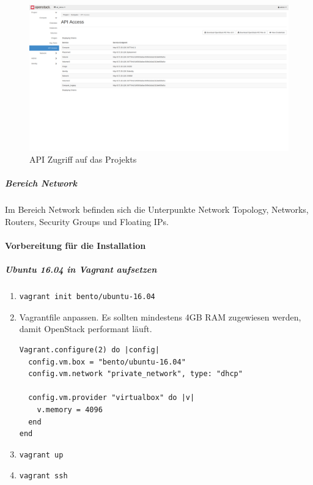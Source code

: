\documentclass[a4paper,10pt]{article}
\numberwithin{figure}{section}
\numberwithin{table}{section}
\begin{document}
\begin{figure}[htbp]
\centering
\caption{API Zugriff auf das Projekts}
\label{fig:devstack:api_access}
\includegraphics[width=\textwidth, trim={0 10cm 0 0}, clip]{graphics/devstack/04_ApiAccess}
\end{figure}

\subparagraph{Bereich Network}

Im Bereich Network befinden sich die Unterpunkte Network Topology, Networks, Routers, Security Groups und Floating IPs.

\paragraph{Vorbereitung für die Installation}

\subparagraph{Ubuntu 16.04 in Vagrant aufsetzen}

\begin{enumerate}
 \item \begin{verbatim}vagrant init bento/ubuntu-16.04\end{verbatim}
 \item Vagrantfile anpassen. Es sollten mindestens 4GB RAM zugewiesen werden, damit OpenStack performant läuft.\\
\begin{minipage}{\textwidth}
\begin{lstlisting}[frame=single,caption=Installation Ubuntu 16.04 in Vagrant, breaklines=true]
Vagrant.configure(2) do |config|
  config.vm.box = "bento/ubuntu-16.04"
  config.vm.network "private_network", type: "dhcp"

  config.vm.provider "virtualbox" do |v|
    v.memory = 4096
  end
end
\end{lstlisting}
\end{minipage}
 \item \begin{verbatim}vagrant up\end{verbatim}
 \item \begin{verbatim}vagrant ssh\end{verbatim}
\end{enumerate}
\end{document}
